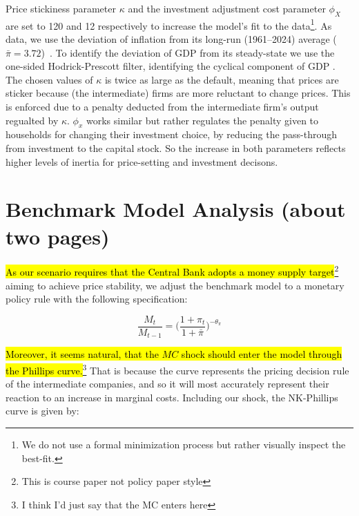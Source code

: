 \documentclass[12pt]{article}
\begin{document}
Price stickiness parameter $\kappa$ and the investment adjustment cost parameter $\phi_X$ are set to 120 and 12 respectively to increase the model's fit to the data\footnote{ We do not use a formal minimization process but rather visually inspect the best-fit.}. As data, we use the deviation of inflation from its long-run (1961--2024) average ($\bar{\pi} =  3.72$)~\parencite{worldbank_inflation_ca}. To identify the deviation of GDP from its steady-state we use the one-sided Hodrick-Prescott filter, identifying the cyclical component of GDP \parencite{fred_gdp_per_capita_ca}. The chosen values of $\kappa$ is twice as large as the default, meaning that prices are sticker because (the intermediate) firms are more reluctant to change prices. This is enforced due to a penalty deducted from the intermediate firm's output regualted by $\kappa$. $\phi_x$ works similar but rather regulates the penalty given to households for changing their investment choice, by reducing the pass-through from investment to the capital stock. So the increase in both parameters reflects higher levels of inertia for price-setting and investment decisons. 

\newpage
\section{Benchmark Model Analysis (about two pages)}

\hl{As our scenario requires that the Central Bank adopts a money supply target}\footnote{This is course paper not policy paper style} aiming to achieve price stability, we adjust the benchmark model to a monetary policy rule with the following specification:


\begin{equation}\label{eq:baseline_rule}
    \frac{M_t}{M_{t-1}} = \Big(\frac{1+\pi_{t}}{1+ \bar \pi}\Big)^{-\theta_{\pi}}
\end{equation}

\hl{Moreover, it seems  natural, that the $MC$ shock should enter the model through the Phillips curve.}\footnote{I think I'd just say that the MC enters here} That is because the curve represents the pricing decision rule of the intermediate companies, and so it will most accurately represent their reaction to an increase in marginal costs. Including our shock, the NK-Phillips curve is given by: 
\end{document}
